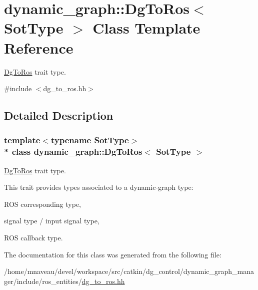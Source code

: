 \hypertarget{classdynamic__graph_1_1DgToRos}{}\section{dynamic\+\_\+graph\+:\+:Dg\+To\+Ros$<$ Sot\+Type $>$ Class Template Reference}
\label{classdynamic__graph_1_1DgToRos}


\hyperlink{classdynamic__graph_1_1DgToRos}{Dg\+To\+Ros} trait type.  




{\ttfamily \#include $<$dg\+\_\+to\+\_\+ros.\+hh$>$}



\subsection{Detailed Description}
\subsubsection*{template$<$typename Sot\+Type$>$\\*
class dynamic\+\_\+graph\+::\+Dg\+To\+Ros$<$ Sot\+Type $>$}

\hyperlink{classdynamic__graph_1_1DgToRos}{Dg\+To\+Ros} trait type. 

This trait provides types associated to a dynamic-\/graph type\+:
\begin{DoxyItemize}
\item R\+OS corresponding type,
\item signal type / input signal type,
\item R\+OS callback type. 
\end{DoxyItemize}

The documentation for this class was generated from the following file\+:\begin{DoxyCompactItemize}
\item 
/home/mnaveau/devel/workspace/src/catkin/dg\+\_\+control/dynamic\+\_\+graph\+\_\+manager/include/ros\+\_\+entities/\hyperlink{dg__to__ros_8hh}{dg\+\_\+to\+\_\+ros.\+hh}\end{DoxyCompactItemize}
